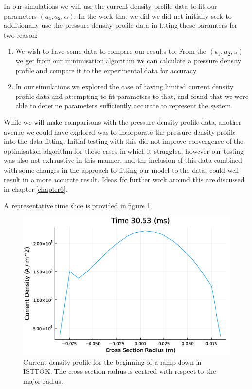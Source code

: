 In our simulations we will use the current density profile data to fit our parameters $(a_1, a_2, \alpha)$. 
In the work that we did we did not initially seek to additionally use the pressure density profile data in fitting 
these paramters for two reason:
\begin{enumerate}
    \item We wish to have some data to compare our results to. From the $(a_1, a_2, \alpha)$ we get from our 
    minimisation algorithm we can calculate a pressure density profile and compare it to the experimental data for accuracy
    \item In our simulations we explored the case of having limited current density profile data and attempting to 
    fit parameters to that, and found that we were able to deterine parameters sufficiently accurate to represent the system.
\end{enumerate}
While we will make comparisons with the pressure density profile data, another avenue we could 
have explored was to incorporate the pressure density profile into the data fitting. Initial testing with this did not improve convergence of the optimisation algorithm for those cases in 
which it struggled, however our testing was also not exhaustive in this manner, and the inclusion of this 
data combined with some changes in the approach to fitting our model to the data, could well result 
in a more accurate result. Ideas for further work around this are discussed in chapter \ref{chapter6}.

A representative time slice is provided in figure \ref{current-profile-unnormalised-0}

\begin{figure}[h!]
    \centering
    \includegraphics[scale=0.6]{imgs/c5/current-profile-unnormalised-0.png}
    \caption{Current density profile for the beginning of a ramp down in ISTTOK. The cross section radius is centred 
    with respect to the major radius.}
    \label{current-profile-unnormalised-0}
\end{figure}\newpage

